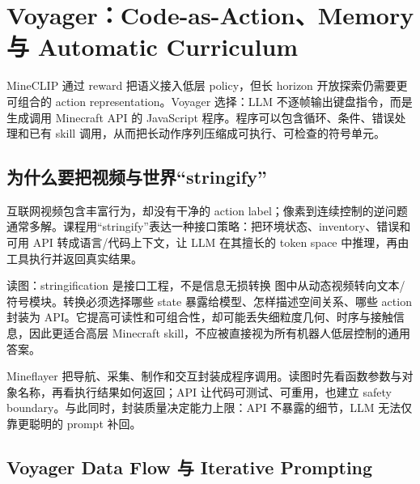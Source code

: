 \section{Voyager：Code-as-Action、Memory 与 Automatic Curriculum}

MineCLIP 通过 reward 把语义接入低层 policy，但长 horizon 开放探索仍需要更可组合的 action representation。Voyager 选择：LLM 不逐帧输出键盘指令，而是生成调用 Minecraft API 的 JavaScript 程序。程序可以包含循环、条件、错误处理和已有 skill 调用，从而把长动作序列压缩成可执行、可检查的符号单元。

\subsection{为什么要把视频与世界“stringify”}

互联网视频包含丰富行为，却没有干净的 action label；像素到连续控制的逆问题通常多解。课程用“stringify”表达一种接口策略：把环境状态、inventory、错误和可用 API 转成语言/代码上下文，让 LLM 在其擅长的 token space 中推理，再由工具执行并返回真实结果。


\begin{knowledgebox}{读图：stringification 是接口工程，不是信息无损转换}
图中从动态视频转向文本/符号模块。转换必须选择哪些 state 暴露给模型、怎样描述空间关系、哪些 action 封装为 API。它提高可读性和可组合性，却可能丢失细粒度几何、时序与接触信息，因此更适合高层 Minecraft skill，不应被直接视为所有机器人低层控制的通用答案。
\end{knowledgebox}


Mineflayer 把导航、采集、制作和交互封装成程序调用。读图时先看函数参数与对象名称，再看执行结果如何返回；API 让代码可测试、可重用，也建立 safety boundary。与此同时，封装质量决定能力上限：API 不暴露的细节，LLM 无法仅靠更聪明的 prompt 补回。


\subsection{Voyager Data Flow 与 Iterative Prompting}

